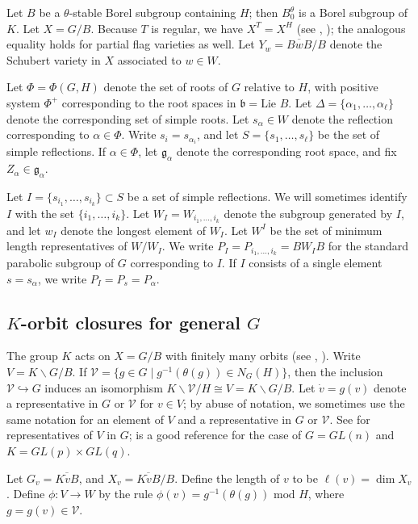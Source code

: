 \documentclass[11pt,letterpaper,reqno]{amsart}
\newcommand{\fb}{{\mathfrak b}}
\newcommand{\fg}{{\mathfrak g}}
\newcommand{\ga}{\alpha}
\numberwithin{equation}{section}
\theoremstyle{plain}
\theoremstyle{definition}
\theoremstyle{remark}
\begin{document}
Let $B$ be a $\theta$-stable 
Borel subgroup containing $H$; then $B^{\theta}_0$ is a Borel subgroup of $K$.  
Let $X = G/B$.  Because $T$ is regular, we have $X^T = X^H$
(see \cite{Brion1999}, \cite{Wys2016}); the analogous equality holds for partial
flag varieties as well. Let $Y_w=\overline{BwB}/B$ denote the Schubert variety in $X$ associated to $w\in W$.

 Let $\Phi = \Phi(G,H)$ denote the set of roots of $G$ relative to $H$, with positive system $\Phi^+$
 corresponding to the root spaces in $\fb = \mbox{Lie }B$.
Let $\Delta = \{ \ga_1, \ldots, \ga_\ell \}$ denote the corresponding set of simple roots.  Let
$s_{\ga} \in W$ denote the reflection corresponding to $\ga \in \Phi$.  Write $s_i = s_{\ga_i}$, and let
 $S = \{ s_1, \ldots, s_\ell \}$ be the set of simple reflections.  If $\ga \in \Phi$, let
$\fg_{\alpha}$ denote the corresponding root space,
and fix $Z_{\alpha} \in \fg_{\alpha}$.  

Let  $I = \{ s_{i_1}, \ldots, s_{i_k} \} \subset S$ be a set of simple reflections.  We will sometimes identify $I$ with the set $\{ i_1, \ldots, i_k \}$.
Let $W_I = W_{i_1, \ldots, i_k}$ denote the subgroup generated by $I$, and let $w_I$ denote the longest element of $W_I$.  
Let $W^I$ be the set of minimum length representatives of $W/W_I$. 
We write $P_I = P_{i_1, \ldots, i_k} =BW_IB$ for the standard parabolic subgroup of $G$ corresponding to $I$.  
If $I$ consists of a single element $s = s_{\ga}$, we write
$P_I = P_s = P_{\ga}$.  

\subsection{$K$-orbit closures for general $G$} \label{ss:K-orb}
The group $K$ acts on $X = G/B$ with finitely many orbits (see \cite{Wol74}, \cite{Mat79}). Write $V=K\backslash G/B$. If
$\mathcal{V}=\{g\in G\;|\;g^{-1}(\theta(g))\in N_G(H)\}$, then the inclusion $\mathcal{V}\hookrightarrow G$ induces an isomorphism $K\backslash\mathcal{V}/H\cong V =K\backslash G/B$.
Let $\dot{v} = g(v)$ denote a representative in $G$ or $\mathcal{V}$ for $v \in V$; by abuse of notation,
we sometimes use the same notation for an element of $V$ and a representative in $G$ or $\mathcal{V}$.
See \cite{Yam} for representatives of $V$ in $G$; \cite{Wys} is a good reference for the case
of $G = GL(n)$ and $K = GL(p) \times GL(q)$.

Let $G_v = \overline{K \dot{v} B}$, and $X_v=\overline{K\dot{v}B}/B$.  Define the length of $v$ to be $\ell(v) = \dim X_v$.
Define $\phi: V \to W$ by the rule $\phi(v) = g^{-1}(\theta(g)) \mbox{ mod } H$, where $g = g(v) \in \mathcal{V}$.
\end{document}
